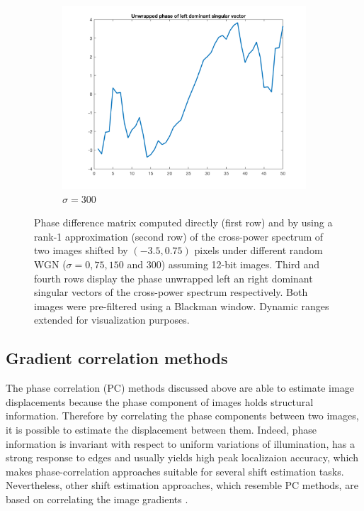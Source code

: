 \begin{figure}[htpb]
\begin{subfigure}{.25\textwidth}
\includegraphics[width=1\textwidth]{img/Hoge1DYSigma300}
\caption{$\sigma = 300$}
\end{subfigure}

\caption{Phase difference matrix computed directly (first row) and by  using a rank-1 approximation (second row) of the cross-power spectrum of two images shifted by $(-3.5, 0.75)$ pixels under different random WGN ($\sigma=0,75,150$ and $300$) assuming 12-bit images. Third and fourth rows display the phase unwrapped left an right dominant singular vectors of the cross-power spectrum respectively. Both images were pre-filtered using a Blackman window. Dynamic ranges extended for visualization purposes.}
\label{fig:denoisedPhaseDifference}
\end{figure}


\subsection{Gradient correlation methods}
The phase correlation (PC) methods discussed above are able to estimate image displacements because the phase component of images holds structural information. Therefore by correlating the phase components between two images, it is possible to estimate the displacement between them. Indeed, phase information is invariant with respect to uniform variations of illumination, has a strong response to edges and usually yields high peak localizaion accuracy, which makes phase-correlation approaches suitable for several shift estimation tasks. Nevertheless, other shift estimation approaches, which resemble PC methods, are based on correlating the image gradients \cite{Argyriou2004, Tzimiropoulos2011, Tzimiropoulos2016}.


